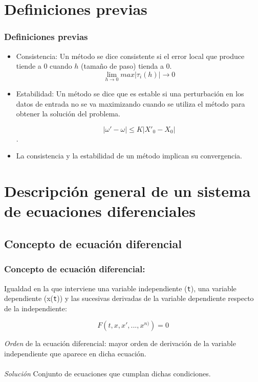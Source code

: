 \documentclass{beamer}
\begin{document}
\section{Definiciones previas}
\begin{frame}
	\frametitle{Definiciones previas}
	
	\begin{itemize}
		\item Consistencia: Un método se dice consistente si el error local que produce tiende a 0 cuando $h$ (tamaño de paso) tienda a 0.
		$$ \lim_{h \rightarrow 0} max | \tau_i(h) | \rightarrow 0 $$
		
		\item Estabilidad: Un método se dice que es estable si una perturbación en los datos de entrada no se va maximizando cuando se utiliza el método para obtener la solución del problema. 
		
		 $$|\omega' - \omega| \leq K|X'_0 - X_0|$$.
		
		\item La consistencia y la estabilidad de un método implican su convergencia.
		
	\end{itemize}
\end{frame}

\section{Descripción general de un sistema de ecuaciones diferenciales}
\subsection{Concepto de ecuación diferencial}
\begin{frame}
	\frametitle{Concepto de ecuación diferencial:}
	
	Igualdad en la que interviene una variable independiente (\texttt{t}), una variable dependiente (x(\texttt{t})) y las sucesivas derivadas de la variable dependiente respecto de la independiente:
	
	$$
	F(t,x,x', ..., x^{n)})=0
	$$
	
	\textit{Orden} de la ecuación diferencial: mayor orden de derivación de la variable independiente que aparece en dicha ecuación.\\~\\
	
	\textit{Solución} Conjunto de ecuaciones que cumplan dichas condiciones.
\end{frame}
\end{document}
